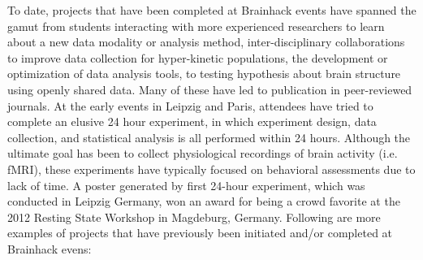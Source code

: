 \documentclass[11pt]{bmc_article_s50}
\begin{document}
To date, projects that have been completed at Brainhack events have spanned the gamut from students interacting with more experienced researchers to learn about a new data modality or analysis method, inter-disciplinary collaborations to improve data collection for hyper-kinetic populations, the development or optimization of data analysis tools, to testing hypothesis about brain structure using openly shared data. Many of these have led to publication in peer-reviewed journals. At the early events in Leipzig and Paris, attendees have tried to complete an elusive 24 hour experiment, in which experiment design, data collection, and statistical analysis is all performed within 24 hours. Although the ultimate goal has been to collect physiological recordings of brain activity (i.e. fMRI), these experiments have typically focused on behavioral assessments due to lack of time. A poster generated by first 24-hour experiment, which was conducted in Leipzig Germany, won an award for being a crowd favorite at the 2012 Resting State Workshop in Magdeburg, Germany. Following are more examples of projects that have previously been initiated and/or completed at Brainhack evens:
\end{document}
